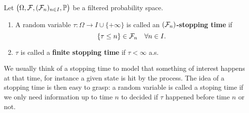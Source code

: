 
\begin{ldef}
\begin{deff}\label{def_stopping_time}
	Let $\big(\Omega,\mathcal{F},(\mathcal{F}_n)_{n\in I},\mathbb{P}\big)$ be a filtered probability space.
	\begin{enumerate}[label=(\roman*)]
	\item	 A random variable $\tau\colon \Omega \rightarrow I \cup\lbrace +\infty \rbrace$ is called an \textbf{$(\mathcal{F}_n)$-stopping time} if
	\[ \lbrace \tau \leq n \rbrace \in \mathcal{F}_n \quad \forall n \in I \text{.}\]
	\item	$\tau$ is called a \textbf{finite stopping time} if $\tau < \infty $ a.s.
\end{enumerate}
\end{deff}
\end{ldef}
We usually think of a stopping time to model that something of interest happens at that time, for instance a given state is hit by the process. The idea of a stopping time is then easy to grasp: a random variable is called a stoping time if we only need information up to time $n$ to decided if $\tau$ happened before time $n$ or not.

